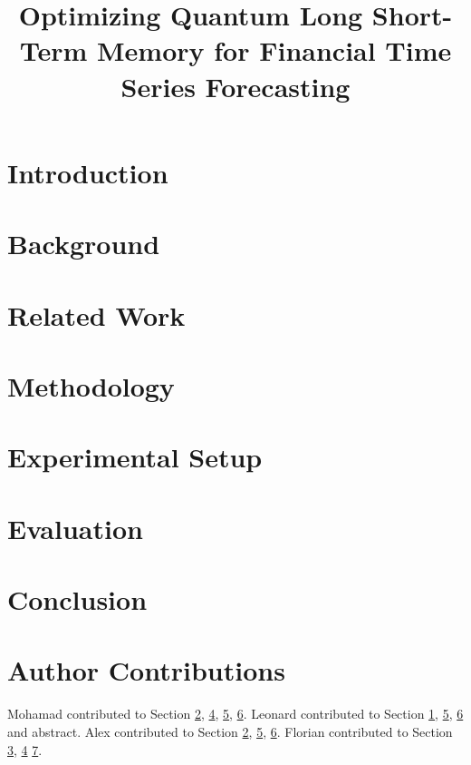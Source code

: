\documentclass[10pt,conference]{IEEEtran}
\begin{document}
\title{Optimizing Quantum Long Short-Term Memory for Financial Time Series Forecasting}

\author{
}
\maketitle

\begin{abstract}

\end{abstract}

\section{Introduction}
\label{sec:introduction}


\section{Background}
\label{sec:background}


\section{Related Work}
\label{sec:relatedwork}


\section{Methodology}
\label{sec:methodology}


\section{Experimental Setup}
\label{sec:setup}


\section{Evaluation}
\label{sec:evaluation}


\section{Conclusion}
\label{sec:conclusion}


\section*{Author Contributions}
Mohamad contributed to Section \ref{sec:background}, \ref{sec:methodology}, \ref{sec:setup}, \ref{sec:evaluation}. Leonard contributed to Section
\ref{sec:introduction}, \ref{sec:setup}, \ref{sec:evaluation} and abstract. Alex contributed to Section \ref{sec:background}, \ref{sec:setup}, \ref{sec:evaluation}. Florian contributed to Section \ref{sec:relatedwork}, \ref{sec:methodology}
\ref{sec:conclusion}.

  
 
\end{document}
